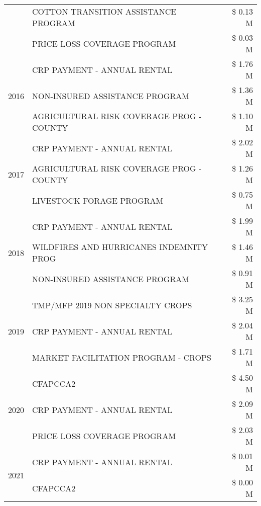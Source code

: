 \begin{tabular}{llr}
 & COTTON TRANSITION ASSISTANCE PROGRAM & \$ 0.13 M \\
 & PRICE LOSS COVERAGE PROGRAM & \$ 0.03 M \\
\cline{1-3}
\multirow[t]{3}{*}{2016} & CRP PAYMENT - ANNUAL RENTAL & \$ 1.76 M \\
 & NON-INSURED ASSISTANCE PROGRAM & \$ 1.36 M \\
 & AGRICULTURAL RISK COVERAGE PROG - COUNTY & \$ 1.10 M \\
\cline{1-3}
\multirow[t]{3}{*}{2017} & CRP PAYMENT - ANNUAL RENTAL & \$ 2.02 M \\
 & AGRICULTURAL RISK COVERAGE PROG - COUNTY & \$ 1.26 M \\
 & LIVESTOCK FORAGE PROGRAM & \$ 0.75 M \\
\cline{1-3}
\multirow[t]{3}{*}{2018} & CRP PAYMENT - ANNUAL RENTAL & \$ 1.99 M \\
 & WILDFIRES AND HURRICANES INDEMNITY PROG & \$ 1.46 M \\
 & NON-INSURED ASSISTANCE PROGRAM & \$ 0.91 M \\
\cline{1-3}
\multirow[t]{3}{*}{2019} & TMP/MFP 2019 NON SPECIALTY CROPS & \$ 3.25 M \\
 & CRP PAYMENT - ANNUAL RENTAL & \$ 2.04 M \\
 & MARKET FACILITATION PROGRAM - CROPS & \$ 1.71 M \\
\cline{1-3}
\multirow[t]{3}{*}{2020} & CFAPCCA2 & \$ 4.50 M \\
 & CRP PAYMENT - ANNUAL RENTAL & \$ 2.09 M \\
 & PRICE LOSS COVERAGE PROGRAM & \$ 2.03 M \\
\cline{1-3}
\multirow[t]{2}{*}{2021} & CRP PAYMENT - ANNUAL RENTAL & \$ 0.01 M \\
 & CFAPCCA2 & \$ 0.00 M \\
\cline{1-3}
\bottomrule
\end{tabular}
